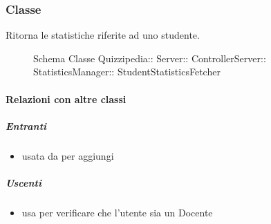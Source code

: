 \subsubsection{Classe }
Ritorna le statistiche riferite ad uno studente.
\begin{figure}[H]
\centering
\noindent{}
\caption[Schema Classe StudentStatisticsFetcher]{Schema Classe Quizzipedia:: Server:: ControllerServer:: StatisticsManager:: StudentStatisticsFetcher}
\end{figure}
\paragraph{Relazioni con altre classi}
\subparagraph{Entranti}
\begin{itemize}
\item usata da  per aggiungi
\end{itemize}
\subparagraph{Uscenti}
\begin{itemize}
\item usa  per verificare che l'utente sia un Docente
\end{itemize}
